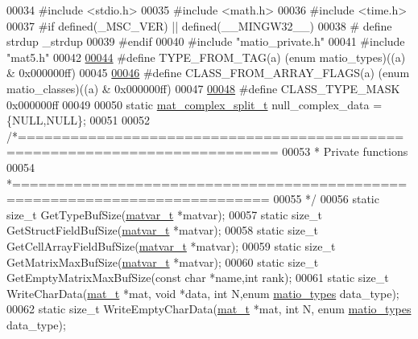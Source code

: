 \begin{DoxyCode}
00034 \textcolor{preprocessor}{#include <stdio.h>}
00035 \textcolor{preprocessor}{#include <math.h>}
00036 \textcolor{preprocessor}{#include <time.h>}
00037 \textcolor{preprocessor}{#if defined(\_MSC\_VER) || defined(\_\_MINGW32\_\_)}
00038 \textcolor{preprocessor}{#   define strdup \_strdup}
00039 \textcolor{preprocessor}{#endif}
00040 \textcolor{preprocessor}{#include "matio\_private.h"}
00041 \textcolor{preprocessor}{#include "mat5.h"}
00042 
\hyperlink{mat5_8c_a82bacecc4afc633b61bc3dc8ef88d1ed}{00044} \textcolor{preprocessor}{#define TYPE\_FROM\_TAG(a)          (enum matio\_types)((a) & 0x000000ff)}
00045 
\hyperlink{mat5_8c_a85a616d27707e89bda9fd2e9bbb6a586}{00046} \textcolor{preprocessor}{#define CLASS\_FROM\_ARRAY\_FLAGS(a) (enum matio\_classes)((a) & 0x000000ff)}
00047 
\hyperlink{mat5_8c_a24b94e17e9c34b9c795798099c710751}{00048} \textcolor{preprocessor}{#define CLASS\_TYPE\_MASK           0x000000ff}
00049 
00050 \textcolor{keyword}{static} \hyperlink{group___m_a_t_structmat__complex__split__t}{mat\_complex\_split\_t} null\_complex\_data = \{NULL,NULL\};
00051 
00052 \textcolor{comment}{/*===========================================================================}
00053 \textcolor{comment}{ *  Private functions}
00054 \textcolor{comment}{ *===========================================================================}
00055 \textcolor{comment}{ */}
00056 \textcolor{keyword}{static} \textcolor{keywordtype}{size\_t} GetTypeBufSize(\hyperlink{group___m_a_t_structmatvar__t}{matvar\_t} *matvar);
00057 \textcolor{keyword}{static} \textcolor{keywordtype}{size\_t} GetStructFieldBufSize(\hyperlink{group___m_a_t_structmatvar__t}{matvar\_t} *matvar);
00058 \textcolor{keyword}{static} \textcolor{keywordtype}{size\_t} GetCellArrayFieldBufSize(\hyperlink{group___m_a_t_structmatvar__t}{matvar\_t} *matvar);
00059 \textcolor{keyword}{static} \textcolor{keywordtype}{size\_t} GetMatrixMaxBufSize(\hyperlink{group___m_a_t_structmatvar__t}{matvar\_t} *matvar);
00060 \textcolor{keyword}{static} \textcolor{keywordtype}{size\_t} GetEmptyMatrixMaxBufSize(\textcolor{keyword}{const} \textcolor{keywordtype}{char} *name,\textcolor{keywordtype}{int} rank);
00061 \textcolor{keyword}{static} \textcolor{keywordtype}{size\_t} WriteCharData(\hyperlink{struct__mat__t}{mat\_t} *mat, \textcolor{keywordtype}{void} *data, \textcolor{keywordtype}{int} N,\textcolor{keyword}{enum} \hyperlink{group___m_a_t_gacf7b3b879282b7ab3a51190e49bf3453}{matio\_types} data\_type);
00062 \textcolor{keyword}{static} \textcolor{keywordtype}{size\_t} WriteEmptyCharData(\hyperlink{struct__mat__t}{mat\_t} *mat, \textcolor{keywordtype}{int} N, \textcolor{keyword}{enum} \hyperlink{group___m_a_t_gacf7b3b879282b7ab3a51190e49bf3453}{matio\_types} data\_type);

\end{DoxyCode}

